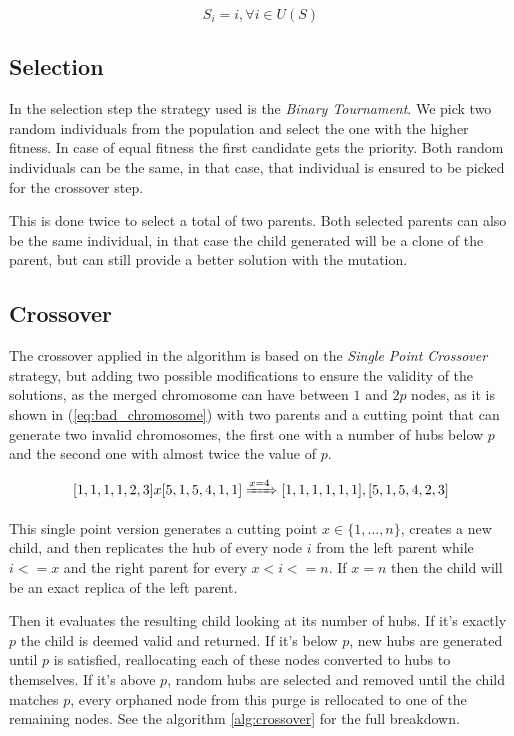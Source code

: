 \begin{equation}
  S_{i}=i, \forall i \in U(S) \label{eq:autoalloc}
\end{equation}

\subsection{Selection}

In the selection step the strategy used is the \emph{Binary Tournament}. We pick two random individuals from
the population and select the one with the higher fitness. In case of equal fitness the first candidate
gets the priority. Both random individuals can be the same, in that case, that individual is ensured to
be picked for the crossover step.

This is done twice to select a total of two parents.  Both selected parents can also be the same individual,
in that case the child generated will be a clone of the parent, but can still provide a better solution with
the mutation.

\subsection{Crossover\label{ss:crossover}}

The crossover applied in the algorithm is based on the \emph{Single Point Crossover} strategy, but adding
two possible modifications to ensure the validity of the solutions, as the merged chromosome can
have between $1$ and $2p$ nodes, as it is shown in (\ref{eq:bad_chromosome}) with two parents and a
cutting point that can generate two invalid chromosomes, the first one with a number of hubs below
$p$ and the second one with almost twice the value of $p$.

\begin{equation}
  \label{eq:bad_chromosome}
  [1,1,1,1,2,3] x [5,1,5,4,1,1] \xRightarrow{x=4} [1,1,1,1,1,1], [5,1,5,4,2,3]
\end{equation}

This single point version generates a cutting point $x \in \{1,\dots,n\}$, creates a new child, and
then replicates the hub of every node $i$ from the left parent while $i<=x$ and the right
parent for every $x<i<=n$. If $x=n$ then the child will be an exact replica of the left parent.

Then it evaluates the resulting child looking at its number of hubs. If it's exactly $p$ the child
is deemed valid and returned. If it's below $p$, new hubs are generated until $p$ is satisfied, reallocating
each of these nodes converted to hubs to themselves. If it's above $p$, random hubs are selected and
removed until the child matches $p$, every orphaned node from this purge is rellocated to one of the
remaining nodes. See the algorithm \ref{alg:crossover} for the full breakdown.

